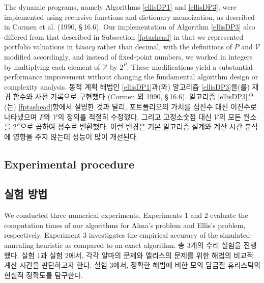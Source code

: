 \documentclass[11pt]{article} %
\theoremstyle{definition}
\theoremstyle{definition}
\begin{document}
\ifen
The dynamic programs, namely Algorithms \ref{ellisDP1} and \ref{ellisDP3}, were implemented using recursive functions and dictionary memoization, as described in Cormen et al. (1990, \S\,16.6). Our implementation of Algorithm \ref{ellisDP3} also differed from that described in Subsection \ref{fptashead} in that we represented portfolio valuations in \emph{binary} rather than decimal, with the definitions of $P$ and $\mathcal{V}$ modified accordingly, and instead of fixed-point numbers, we worked in integers by multiplying each element of $\mathcal{V}$ by $2^P$. These modifications yield a substantial performance improvement without changing the fundamental algorithm design or complexity analysis.
\else
동적 계획 해법인 \ref{ellisDP1}과(와) 알고리즘 \ref{ellisDP3}을(를) 재귀 함수와 사전 기록으로 구현했다 (Cormen 외 1990, \S\,16.6). 알고리즘 \ref{ellisDP3}은(는) \ref{fptashead}항에서 설명한 것과 달리, 포트폴리오의 가치를 십진수 대신 이진수로 나타냈으며 $P$와  $\mathcal{V}$의 정의를 적절히 수정했다. 그리고 고정소숫점 대신 $\mathcal{V}$의 모든 원소를 $2^P$으로 곱하여 정수로 변환했다. 이런 변경은 기본 알고리즘 설계와 계산 시간 분석에 영향을 주지 않는데 성능이 많이 개선된다.
\fi


\ifen \subsection{Experimental procedure} \else \subsection{실험 방법}\fi
\ifen
We conducted three numerical experiments. Experiments 1 and 2 evaluate the computation times of our algorithms for Alma's problem and Ellis's problem, respectively. Experiment 3 investigates the empirical accuracy of the simulated-annealing heuristic as compared to an exact algorithm. 
\else
총 3개의 수리 실험을 진행했다. 실험 1과 실험 2에서, 각각 알마의 문제와 엘리스의 문제를 위한 해법의 비교적 계산 시간을 판단하고자 한다. 실험 3에서, 정확한 해법에 비한 모의 담금질 휴리스틱의 현실적 정확도를 탐구한다.
\fi
\end{document}
